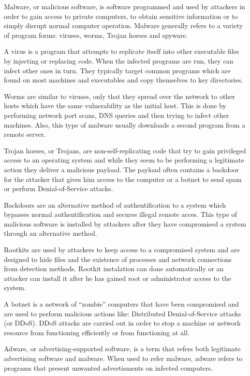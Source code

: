 Malware, or malicious software, is software programmed and used by attackers in order to gain access to private computers, to obtain sensitive information or to simply disrupt normal computer operation. Malware generally refers to a variety of program forms: viruses, worms, Trojan horses and spyware.

A virus is a program that attempts to replicate itself into other executable files by injecting or replacing code. When the infected programs are run, they can infect other ones in turn. They typically target common programs which are found on most machines and executables and copy themselves to key directories.

Worms are similar to viruses, only that they spread over the network to other hosts which have the same vulnerability as the initial host. This is done by performing network port scans, DNS queries and then trying to infect other machines. Also, this type of malware usually downloads a second program from a remote server.

Trojan horses, or Trojans, are non-self-replicating code that try to gain privileged access to an operating system and while they seem to be performing a legitimate action they deliver a malicious payload. The payload often contains a backdoor for the attacker that gives him access to the computer or a botnet to send spam or perform Denial-of-Service attacks.

Backdoors are an alternative method of authentification to a system which bypasses normal authentification and secures illegal remote acces. This type of malicious software is installed by attackers after they have compromised a system through an alternative method.

Rootkits are used by attackers to keep access to a compromised system and are designed to hide files and the existence of processes and network connections from detection methods. Rootkit instalation can done automatically or an attacker can install it after he has gained root or administrator access to the system.

A botnet is a network of ``zombie'' computers that have been compromised and are used to perform malicious actions like: Distributed Denial-of-Service attacks (or DDoS). DDoS attacks are carried out in order to stop a machine or network resource from functioning efficiently or from functioning at all.

Adware, or advertising-supported software, is a term that refers both legitimate advertising software and malware. When used to refer malware, adware refers to programs that present unwanted advertisments on infected computers.

